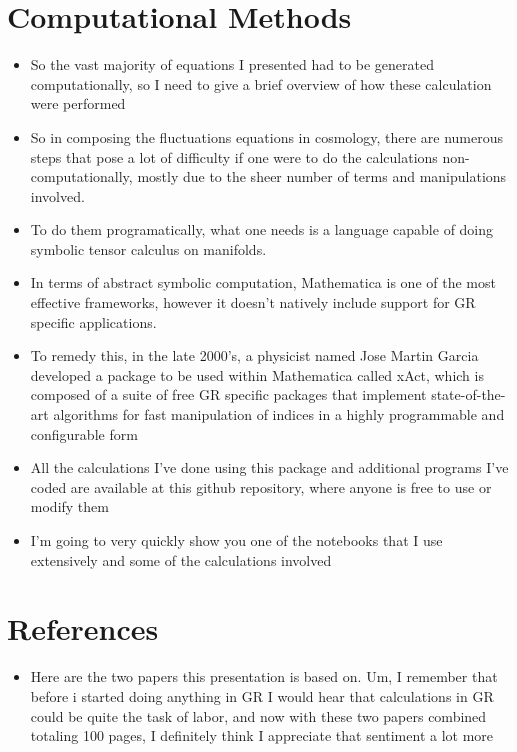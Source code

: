 \documentclass[10pt,letterpaper]{article}
\numberwithin{equation}{section}
\begin{document}
\section{Computational Methods}
\begin{itemize}
	\item So the vast majority of equations I presented had to be generated computationally, so I need to give a brief overview of how these calculation were performed
	\item So in composing the fluctuations equations in cosmology, there are numerous steps that pose a lot of difficulty if one were to do the calculations non-computationally, mostly due to the sheer number of terms and manipulations involved. 
	\item To do them programatically, what one needs is a language capable of doing symbolic tensor calculus on manifolds. 
	\item In terms of abstract symbolic computation, Mathematica is one of the most effective frameworks, however it doesn't natively include support for GR specific applications.
	\item To remedy this, in the late 2000's, a physicist named Jose Martin Garcia developed a package to be used within Mathematica called xAct, which is composed of a suite of free GR specific packages that implement state-of-the-art algorithms for fast manipulation of indices in a highly programmable and configurable form
	\item All the calculations I've done using this package and additional programs I've coded are available at this github repository, where anyone is free to use or modify them
	\item I'm going to very quickly show you one of the notebooks that I use extensively and some of the calculations involved
\end{itemize}


\section{References}
\begin{itemize}
	\item Here are the two papers this presentation is based on. Um, I remember that before i started doing anything in GR I would hear that calculations in GR could be quite the task of labor, and now with these two papers combined totaling 100 pages, I definitely think I appreciate that sentiment a lot more
\end{itemize}
\end{document}
